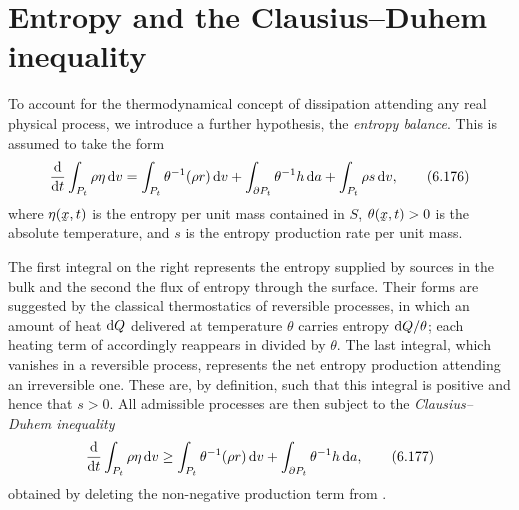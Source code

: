 
\section{Entropy and the Clausius--Duhem
inequality}\label{sec:ch6entropy}

To account for the thermodynamical concept of dissipation attending any
real physical process, we introduce a further hypothesis, the
\emph{entropy balance}. This is assumed to take the form
\begin{equation}
   \frac{\mathrm{d}}{\mathrm{d} t}\int_{P_{t}}\rho\eta\,\mathrm{d} v
   =\int_{P_{t}}\theta^{-1}(\rho r)\,\mathrm{d} v
   +\int_{\partial P_{t}}\theta^{-1}h\,\mathrm{d} a
   +\int_{P_{t}}\rho s\,\mathrm{d} v ,
   \tag{6.176}\label{eq:6.176}
\end{equation}
where $\eta(\bx,t)$ is the entropy per unit mass contained in $S$,
$\theta(\bx,t)>0$ is the absolute temperature, and $s$ is the entropy
production rate per unit mass.


The first integral on the right represents the entropy supplied by
sources in the bulk and the second the flux of entropy through the
surface. Their forms are suggested by the classical thermostatics of
reversible processes, in which an amount of heat $\mathrm{d} Q$ delivered at
temperature $\theta$ carries entropy $\mathrm{d} Q/\theta$; each heating term
of  accordingly reappears in  divided by
$\theta$. The last integral, which vanishes in a reversible process,
represents the net entropy production attending an irreversible one.
These are, by definition, such that this integral is positive and hence
that $s>0$. All admissible processes are then subject to the
\emph{Clausius--Duhem inequality}
\begin{equation}
   \frac{\mathrm{d}}{\mathrm{d} t}\int_{P_{t}}\rho\eta\,\mathrm{d} v
   \geq\int_{P_{t}}\theta^{-1}(\rho r)\,\mathrm{d} v
   +\int_{\partial P_{t}}\theta^{-1}h\,\mathrm{d} a ,
   \tag{6.177}\label{eq:6.177}
\end{equation}
obtained by deleting the non-negative production term from
.


